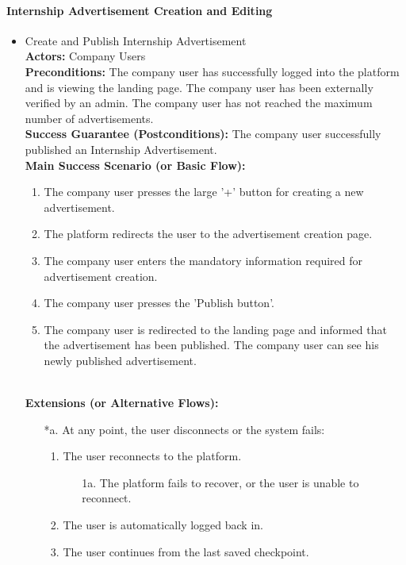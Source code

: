 \paragraph{Internship Advertisement Creation and Editing}
\begin{itemize}[label={[\textbf{UC}]}, align=left, leftmargin=*]
     \item {} Create and Publish Internship Advertisement \\
     \textbf{Actors:} Company Users\\
     \textbf{Preconditions:} The company user has successfully logged into the platform and is viewing the landing page. The company user has been externally verified by an admin. The company user has not reached the maximum number of advertisements.\\
     \textbf{Success Guarantee (Postconditions):} The company user successfully published an Internship Advertisement. \\
     \textbf{Main Success Scenario (or Basic Flow):} 
     \begin{enumerate}[label=\arabic*.] 
        \item The company user presses the large '+' button for creating a new advertisement. 
        \item The platform redirects the user to the advertisement creation page.
        \item The company user enters the mandatory information required for advertisement creation.
        \item The company user presses the 'Publish button'.
        \item The company user is redirected to the landing page and informed that the advertisement has been published. The company user can see his newly published advertisement.
     \end{enumerate} \\

    \textbf{Extensions (or Alternative Flows):} 
    \begin{enumerate}[label=\arabic*.]
        \item[*a.] At any point, the user disconnects or the system fails:
            \begin{enumerate}[label=\arabic*.]
                \item The user reconnects to the platform.
                    \begin{enumerate}[label=\alph*.]
                        \item[1a.] The platform fails to recover, or the user is unable to reconnect.
                    \end{enumerate}
                 \item The user is automatically logged back in.
                 \item The user continues from the last saved checkpoint.
            \end{enumerate}
        

\end{enumerate}
\end{itemize}
